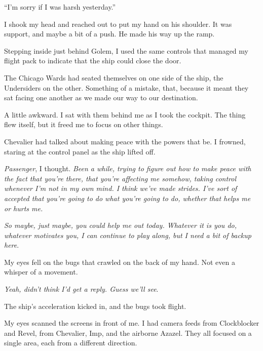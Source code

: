 ``I'm sorry if I was harsh yesterday.''



I shook my head and reached out to put my hand on his shoulder.  It was support, and maybe a bit of a push.  He made his way up the ramp.



Stepping inside just behind Golem, I used the same controls that managed my flight pack to indicate that the ship could close the door.



The Chicago Wards had seated themselves on one side of the ship, the Undersiders on the other.  Something of a mistake, that, because it meant they sat facing one another as we made our way to our destination.



A little awkward.  I sat with them behind me as I took the cockpit.  The thing flew itself, but it freed me to focus on other things.



Chevalier had talked about making peace with the powers that be.  I frowned, staring at the control panel as the ship lifted off.



\emph{Passenger}, I thought.  \emph{Been a while, trying to figure out how to make peace with the fact that you're there, that you're affecting me somehow, taking control whenever I'm not in my own mind.  I think we've made strides.  I've sort of accepted that you're going to do what you're going to do, whether that helps me or hurts me.  }



\emph{So maybe, just maybe, you could help me out today.  Whatever it is you do, whatever motivates you, I can continue to play along, but I need a bit of backup here}.



My eyes fell on the bugs that crawled on the back of my hand.  Not even a whisper of a movement.



\emph{Yeah, didn't think I'd get a reply.  Guess we'll see}.



The ship's acceleration kicked in, and the bugs took flight.



\sectionbreak



My eyes scanned the screens in front of me.  I had camera feeds from Clockblocker and Revel, from Chevalier, Imp, and the airborne Azazel.  They all focused on a single area, each from a different direction.



